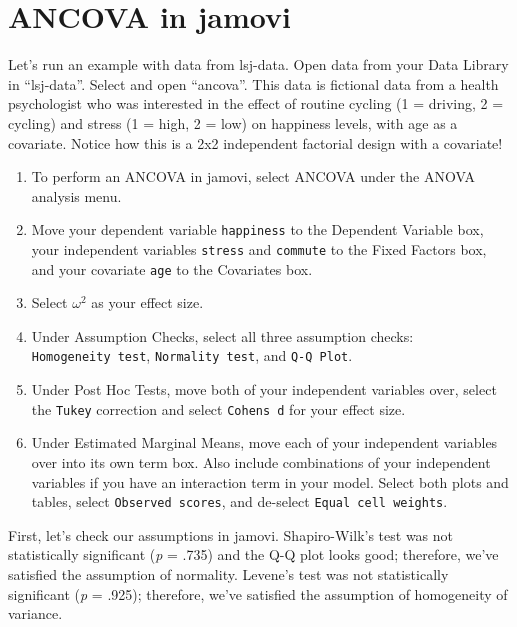 \documentclass[
]{book}
\begin{document}
\hypertarget{ancova-in-jamovi}{%
\section{ANCOVA in jamovi}\label{ancova-in-jamovi}}

Let's run an example with data from lsj-data. Open data from your Data Library in ``lsj-data''. Select and open ``ancova''. This data is fictional data from a health psychologist who was interested in the effect of routine cycling (1 = driving, 2 = cycling) and stress (1 = high, 2 = low) on happiness levels, with age as a covariate. Notice how this is a 2x2 independent factorial design with a covariate!

\begin{enumerate}
\def\labelenumi{\arabic{enumi}.}
\item
  To perform an ANCOVA in jamovi, select ANCOVA under the ANOVA analysis menu.
\item
  Move your dependent variable \texttt{happiness} to the Dependent Variable box, your independent variables \texttt{stress} and \texttt{commute} to the Fixed Factors box, and your covariate \texttt{age} to the Covariates box.
\item
  Select \(\omega^2\) as your effect size.
\item
  Under Assumption Checks, select all three assumption checks: \texttt{Homogeneity\ test}, \texttt{Normality\ test}, and \texttt{Q-Q\ Plot}.
\item
  Under Post Hoc Tests, move both of your independent variables over, select the \texttt{Tukey} correction and select \texttt{Cohen\textquotesingle{}s\ d} for your effect size.
\item
  Under Estimated Marginal Means, move each of your independent variables over into its own term box. Also include combinations of your independent variables if you have an interaction term in your model. Select both plots and tables, select \texttt{Observed\ scores}, and de-select \texttt{Equal\ cell\ weights}.
\end{enumerate}

First, let's check our assumptions in jamovi. Shapiro-Wilk's test was not statistically significant (\emph{p} = .735) and the Q-Q plot looks good; therefore, we've satisfied the assumption of normality. Levene's test was not statistically significant (\emph{p} = .925); therefore, we've satisfied the assumption of homogeneity of variance.
\end{document}

